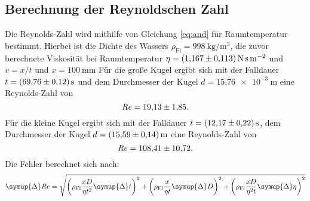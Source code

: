 \subsection{Berechnung der Reynoldschen Zahl}
Die Reynolds-Zahl wird mithilfe von Gleichung \eqref{eq:and} für Raumtemperatur bestimmt.
Hierbei ist die Dichte des Wassers
\mbox{$\rho_\text{Fl} = \SI[per-mode=reciprocal]{998}{\kg\per\meter\cubed}$},
die zuvor berechnete Viskosität bei Raumtemperatur
\mbox{$\eta = \SI[per-mode=reciprocal]{1.167\pm0.113}{\newton\second\per\meter\squared}$} und
$v=x/t$ und $x=\SI{100}{\milli\meter}$
Für die große Kugel ergibt sich mit der Falldauer
\mbox{$t = \SI[per-mode=reciprocal]{69.76\pm0.12}{\second}$} und
dem Durchmesser der Kugel
\mbox{$d = \SI[per-mode=reciprocal]{15.76e-3}{\meter}$}
eine Reynolds-Zahl von
\begin{equation}
    \mathit{R\kern-.04em e} = \num{19.13\pm1.85}.
\end{equation}
%
Für die kleine Kugel ergibt sich mit
der Falldauer
\mbox{$t = \SI[per-mode=reciprocal]{12.17\pm0.22}{\second}$},
dem Durchmesser der Kugel
\mbox{$d = \SI[per-mode=reciprocal]{15.59\pm0.14}{\meter}$}
eine Reynolds-Zahl von
\begin{equation}
    \mathit{R\kern-.04em e} = \num{108.41\pm10.72}.
\end{equation}
%
Die Fehler berechnet sich nach:
\begin{equation}
    \symup{\Delta}\mathit{R\kern-.04em e} = \sqrt{
        \left(\rho_\text{Fl} \frac{xD}{\eta t^2}\symup{\Delta}t \right)^2 +
        \left(\rho_\text{Fl} \frac{x}{\eta t}\symup{\Delta}D \right)^2 +
        \left(\rho_\text{Fl} \frac{xD}{\eta^2 t}\symup{\Delta}\eta \right)^2
    }
\end{equation}
